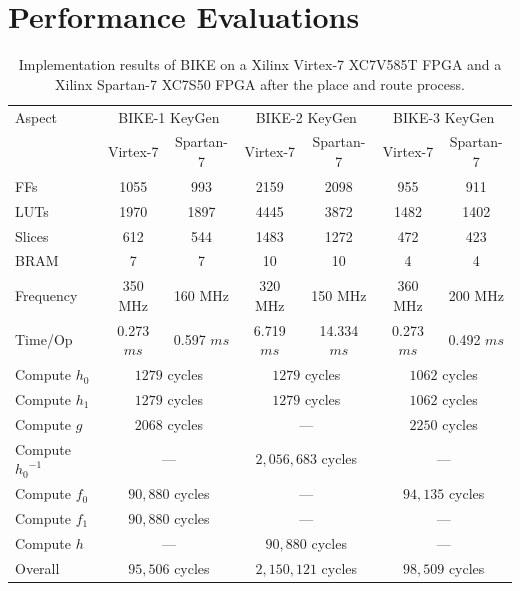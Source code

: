 \documentclass[runningheads]{llncs}
\begin{document}
\section{Performance Evaluations}
\label{sec::evaluation}

\begin{table}[!t]\centering
 \caption{Implementation results of BIKE on a Xilinx Virtex-7 XC7V585T FPGA and a Xilinx Spartan-7 XC7S50 FPGA after the place and route process.}
 \label{table:expresult}\centering
 \begin{minipage}{\textwidth}\centering
  \begin{tabular}{lcccccc}
   \hline
   Aspect & \multicolumn{2}{c}{BIKE-1 KeyGen} & \multicolumn{2}{c}{BIKE-2 KeyGen} & \multicolumn{2}{c}{BIKE-3 KeyGen}\\
    & Virtex-7 & Spartan-7  & Virtex-7 & Spartan-7  & Virtex-7 & Spartan-7\\
   \hline
   FFs &1055   &993  &2159 &2098 &955 &911\\
   LUTs & 1970  &1897  &4445 &3872&1482&1402  \\
   Slices& 612 &544  &1483 &1272&472&423  \\
   BRAM & 7  &7  &10 & 10& 4&4\\
   \hline
   Frequency &  350 MHz  & 160 MHz &320 MHz & 150 MHz  & 360 MHz & 200 MHz\\
   Time/Op &  0.273 $ms$ &  0.597 $ms$ & 6.719 $ms$& 14.334 $ms$ &0.273 $ms$  & 0.492 $ms$\\
   \hline
   Compute $h_0$ & \multicolumn{2}{c}{$1279$ cycles} & \multicolumn{2}{c}{$1279$ cycles}  & \multicolumn{2}{c}{$1062$ cycles}\\
   Compute $h_1$& \multicolumn{2}{c}{$1279$ cycles} & \multicolumn{2}{c}{$1279$ cycles} & \multicolumn{2}{c}{$1062$ cycles}\\
   Compute $g$ & \multicolumn{2}{c}{$2068$ cycles} & \multicolumn{2}{c}{---} & \multicolumn{2}{c}{$2250$ cycles}\\
   Compute ${h_0}^{-1}$ & \multicolumn{2}{c}{---} & \multicolumn{2}{c}{$2,056,683$ cycles} &\multicolumn{2}{c}{---}\\
   Compute $f_0$ & \multicolumn{2}{c}{$90,880$ cycles} & \multicolumn{2}{c}{---} &\multicolumn{2}{c}{$94,135$ cycles}\\
   Compute $f_1$ & \multicolumn{2}{c}{$90,880$ cycles}  & \multicolumn{2}{c}{---} &\multicolumn{2}{c}{---}\\
   Compute $h$  &  \multicolumn{2}{c}{---}          & \multicolumn{2}{c}{$90,880$ cycles} & \multicolumn{2}{c}{---}\\
   \hline
   Overall & \multicolumn{2}{c}{$95,506$ cycles} & \multicolumn{2}{c}{$2,150,121$ cycles} & \multicolumn{2}{c}{$98,509$ cycles}\\
   \hline
  \end{tabular}
  \end{minipage}
\vspace{-4mm}
\end{table}
\end{document}
